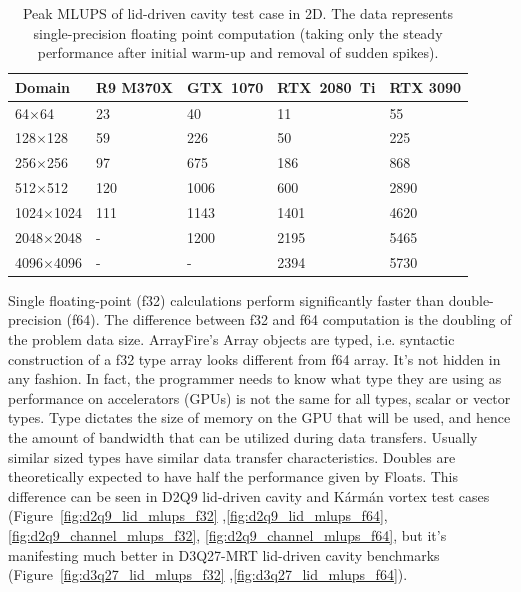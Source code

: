 \begin{table}[!ht]
	\centering\small
	{\renewcommand{\arraystretch}{1.1}%
		{\setlength{\tabcolsep}{0.5em}
	\begin{tabular}{ |p{2.7cm}||p{2.2cm}|p{2.2cm}|p{2.4cm}|p{2.1cm}|  }
		\hline
		Domain & R9 M370X & GTX~1070 & RTX~2080~Ti & RTX 3090 \\
		\hline
		64$\times$64   & 23 & 40  & 11  & 55  \\
		\hline
		128$\times$128   & 59 & 226  & 50   & 225  \\
		\hline
		256$\times$256   & 97 & 675  & 186   & 868  \\
		\hline
		512$\times$512   & 120 & 1006  & 600   & 2890  \\
		\hline
		1024$\times$1024   & 111 & 1143   & 1401   & 4620  \\
		\hline
		2048$\times$2048   & - & 1200  & 2195  & 5465  \\
		\hline
		4096$\times$4096   & - & -  & 2394  & 5730  \\
		\hline
	\end{tabular}}}
	\caption{Peak MLUPS of lid-driven cavity test case in 2D. The data represents single-precision floating point computation (taking only the steady performance after initial warm-up and removal of sudden spikes).}
	\label{tab:lid-mlups-all-2d}
\end{table}

Single floating-point (f32) calculations perform significantly faster than double-precision (f64). The difference between f32 and f64 computation is the doubling of the problem data size. ArrayFire's Array objects are typed, i.e. syntactic construction of a f32 type array looks different from f64 array. It's not hidden in any fashion. In fact, the programmer needs to know what type they are using as performance on accelerators (GPUs) is not the same for all types, scalar or vector types. Type dictates the size of memory on the GPU that will be used, and hence the amount of bandwidth that can be utilized during data transfers. Usually similar sized types have similar data transfer characteristics. Doubles are theoretically expected to have half the performance given by Floats. This difference can be seen in D2Q9 lid-driven cavity and Kármán vortex test cases (Figure~\ref{fig:d2q9_lid_mlups_f32} ,\ref{fig:d2q9_lid_mlups_f64}, \ref{fig:d2q9_channel_mlups_f32}, \ref{fig:d2q9_channel_mlups_f64}, but it's manifesting much better in D3Q27-MRT lid-driven cavity benchmarks (Figure~\ref{fig:d3q27_lid_mlups_f32} ,\ref{fig:d3q27_lid_mlups_f64}).

